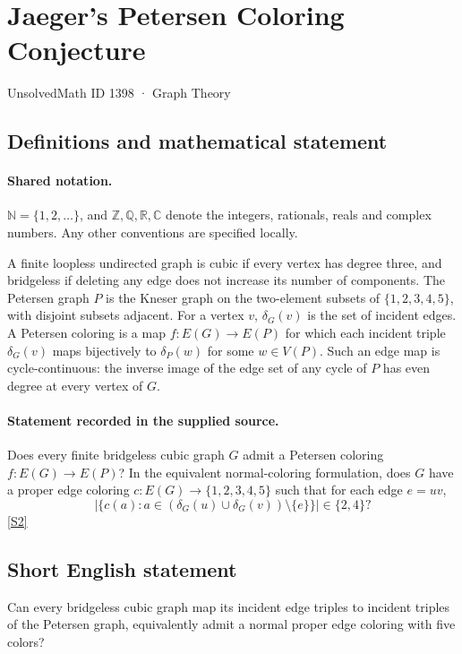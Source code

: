 \documentclass[11pt]{article}
\newcommand{\sref}[2]{\hyperlink{source:#1:#2}{[S#2]}}
\begin{document}
\setcounter{section}{1397}
\section{Jaeger's Petersen Coloring Conjecture}\label{1398}
{\small\sffamily UnsolvedMath ID 1398 · Graph Theory}
\subsection{Definitions and mathematical statement}

\paragraph{Shared notation.}$\mathbb N=\{1,2,\ldots\}$, and $\mathbb Z,\mathbb Q,\mathbb R,\mathbb C$ denote the integers, rationals, reals and complex numbers. Any other conventions are specified locally.


A finite loopless undirected graph is cubic if every vertex has degree three, and bridgeless if deleting any edge does not increase its number of components. The Petersen graph $P$ is the Kneser graph on the two-element subsets of $\{1,2,3,4,5\}$, with disjoint subsets adjacent. For a vertex $v$, $\delta_G(v)$ is the set of incident edges. A Petersen coloring is a map $f:E(G)\to E(P)$ for which each incident triple $\delta_G(v)$ maps bijectively to $\delta_P(w)$ for some $w\in V(P)$. Such an edge map is cycle-continuous: the inverse image of the edge set of any cycle of $P$ has even degree at every vertex of $G$.
\paragraph{Statement recorded in the supplied source.}
Does every finite bridgeless cubic graph $G$ admit a Petersen coloring $f:E(G)\to E(P)$? In the equivalent normal-coloring formulation, does $G$ have a proper edge coloring $c:E(G)\to\{1,2,3,4,5\}$ such that for each edge $e=uv$,
\[
 \left|\{c(a):a\in(\delta_G(u)\cup\delta_G(v))\setminus\{e\}\}\right|\in\{2,4\}?
\]
\sref{1398}{2}
\subsection{Short English statement}
Can every bridgeless cubic graph map its incident edge triples to incident triples of the Petersen graph, equivalently admit a normal proper edge coloring with five colors?
\end{document}
